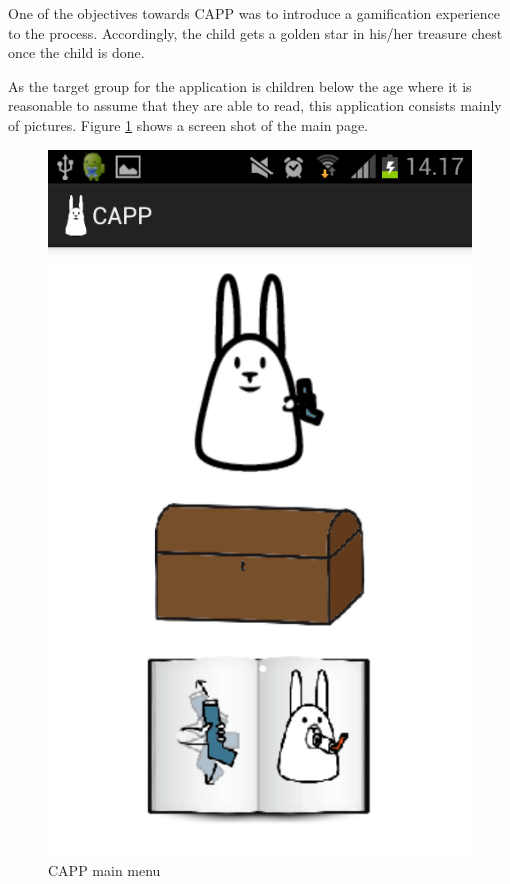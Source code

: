 One of the objectives towards CAPP was to introduce a gamification experience to the process. Accordingly, the child gets a golden star in his/her treasure chest once the child is done.

As the target group for the application is children below the age where it is reasonable to assume that they are able to read, this application consists mainly of pictures.  
Figure \ref{fig:capp-main-menu} shows a screen shot of the main page. 

\begin{figure}
		\centering
			\includegraphics[width=0.20\paperwidth]{Pictures/app-screenshots/capp_main_menu.png}
		\caption{CAPP main menu}
		\label{fig:capp-main-menu}
\end{figure}



